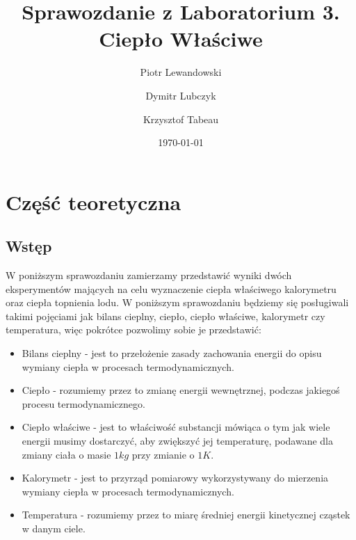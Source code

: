 \documentclass{article}
\title{Sprawozdanie z Laboratorium 3. \\ \large Ciepło Właściwe }
\author{Piotr Lewandowski \and Dymitr Lubczyk \and Krzysztof Tabeau }
\date{\today}
\begin{document}
\maketitle
\clearpage
\section{Część teoretyczna}
\subsection{Wstęp}
W poniższym sprawozdaniu zamierzamy przedstawić wyniki dwóch eksperymentów mających na celu wyznaczenie ciepła właściwego kalorymetru oraz ciepła topnienia lodu. W poniższym sprawozdaniu będziemy się posługiwali takimi pojęciami jak  bilans cieplny, ciepło, ciepło właściwe, kalorymetr czy temperatura, więc pokrótce pozwolimy sobie je przedstawić:
\begin{itemize}
\item Bilans cieplny - jest to przełożenie zasady zachowania energii do opisu wymiany ciepła w procesach termodynamicznych.
\item Ciepło - rozumiemy przez to zmianę energii wewnętrznej, podczas jakiegoś procesu termodynamicznego.
\item Ciepło właściwe - jest to właściwość substancji mówiąca o tym jak wiele energii musimy dostarczyć, aby zwiększyć jej temperaturę, podawane dla zmiany ciała o masie $1 kg$ przy zmianie o $1K$.
\item Kalorymetr - jest to przyrząd pomiarowy wykorzystywany do mierzenia wymiany ciepła w procesach termodynamicznych.
\item Temperatura - rozumiemy przez to miarę średniej energii kinetycznej cząstek w danym ciele.
\end{itemize}
\end{document}
